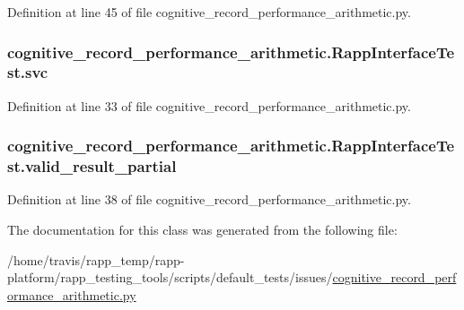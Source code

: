 Definition at line 45 of file cognitive\-\_\-record\-\_\-performance\-\_\-arithmetic.\-py.

\hypertarget{classcognitive__record__performance__arithmetic_1_1RappInterfaceTest_a8ee33d88404903570d430b5f29d382c3}{
\subsubsection[{svc}]{\setlength{\rightskip}{0pt plus 5cm}cognitive\-\_\-record\-\_\-performance\-\_\-arithmetic.\-Rapp\-Interface\-Test.\-svc}}\label{classcognitive__record__performance__arithmetic_1_1RappInterfaceTest_a8ee33d88404903570d430b5f29d382c3}


Definition at line 33 of file cognitive\-\_\-record\-\_\-performance\-\_\-arithmetic.\-py.

\hypertarget{classcognitive__record__performance__arithmetic_1_1RappInterfaceTest_a538bdab11a37475593b39ce725c06d4b}{
\subsubsection[{valid\-\_\-result\-\_\-partial}]{\setlength{\rightskip}{0pt plus 5cm}cognitive\-\_\-record\-\_\-performance\-\_\-arithmetic.\-Rapp\-Interface\-Test.\-valid\-\_\-result\-\_\-partial}}\label{classcognitive__record__performance__arithmetic_1_1RappInterfaceTest_a538bdab11a37475593b39ce725c06d4b}


Definition at line 38 of file cognitive\-\_\-record\-\_\-performance\-\_\-arithmetic.\-py.



The documentation for this class was generated from the following file\-:\begin{DoxyCompactItemize}
\item 
/home/travis/rapp\-\_\-temp/rapp-\/platform/rapp\-\_\-testing\-\_\-tools/scripts/default\-\_\-tests/issues/\hyperlink{cognitive__record__performance__arithmetic_8py}{cognitive\-\_\-record\-\_\-performance\-\_\-arithmetic.\-py}\end{DoxyCompactItemize}
